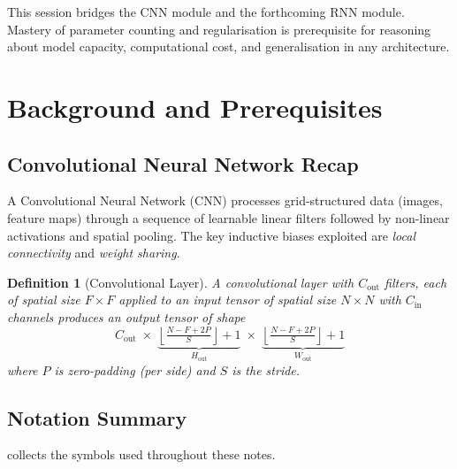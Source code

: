 \documentclass[12pt,a4paper]{article}
\newtheorem{definition}{Definition}[section]
\newcommand{\Cin}{C_{\mathrm{in}}}
\newcommand{\Cout}{C_{\mathrm{out}}}
\newcommand{\floor}[1]{\left\lfloor #1 \right\rfloor}
\begin{document}
\begin{keyinsight}
This session bridges the CNN module and the forthcoming RNN module. Mastery
of parameter counting and regularisation is prerequisite for reasoning about
model capacity, computational cost, and generalisation in any architecture.
\end{keyinsight}

\section{Background and Prerequisites}
\label{sec:background}

\subsection{Convolutional Neural Network Recap}

A Convolutional Neural Network (CNN) processes grid-structured data (images,
feature maps) through a sequence of learnable linear filters followed by
non-linear activations and spatial pooling. The key inductive biases
exploited are \emph{local connectivity} and \emph{weight sharing}.

\begin{definition}[Convolutional Layer]
\label{def:conv_layer}
A convolutional layer with $\Cout$ filters, each of spatial size $F \times F$
applied to an input tensor of spatial size $N \times N$ with $\Cin$ channels
produces an output tensor of shape
\[
  \Cout \;\times\;
  \underbrace{\floor{\tfrac{N - F + 2P}{S}} + 1}_{H_{\mathrm{out}}}
  \;\times\;
  \underbrace{\floor{\tfrac{N - F + 2P}{S}} + 1}_{W_{\mathrm{out}}}
\]
where $P$ is zero-padding (per side) and $S$ is the stride.
\end{definition}

\subsection{Notation Summary}

 collects the symbols used throughout these notes.
\end{document}
